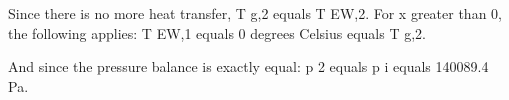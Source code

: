 Since there is no more heat transfer, T g,2 equals T EW,2.  
For x greater than 0, the following applies:  
T EW,1 equals 0 degrees Celsius equals T g,2.  

And since the pressure balance is exactly equal:  
p 2 equals p i equals 140089.4 Pa.